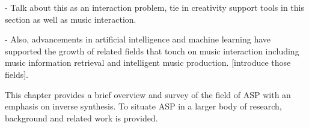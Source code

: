 - Talk about this as an interaction problem, tie in creativity support tools in this section as well as music interaction.

- Also, advancements in artificial intelligence and machine learning have supported the growth of related fields that touch on music interaction including music information retrieval and intelligent music production. [introduce those fields].



% 

This chapter provides a brief overview and survey of the field of ASP with an emphasis on inverse synthesis. To situate ASP in a larger body of research, background and related work is provided.






